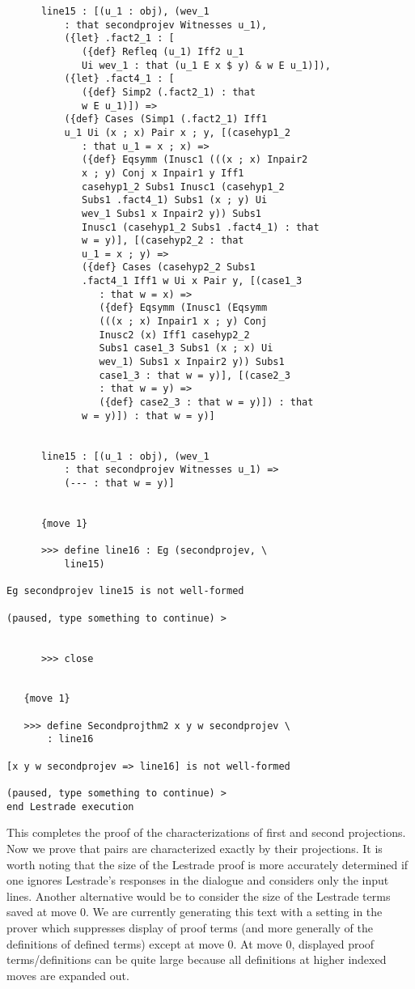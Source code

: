 \documentclass[12pt]{article}
\begin{document}
\begin{verbatim}
      line15 : [(u_1 : obj), (wev_1 
          : that secondprojev Witnesses u_1), 
          ({let} .fact2_1 : [
             ({def} Refleq (u_1) Iff2 u_1 
             Ui wev_1 : that (u_1 E x $ y) & w E u_1)]), 
          ({let} .fact4_1 : [
             ({def} Simp2 (.fact2_1) : that 
             w E u_1)]) => 
          ({def} Cases (Simp1 (.fact2_1) Iff1 
          u_1 Ui (x ; x) Pair x ; y, [(casehyp1_2 
             : that u_1 = x ; x) => 
             ({def} Eqsymm (Inusc1 (((x ; x) Inpair2 
             x ; y) Conj x Inpair1 y Iff1 
             casehyp1_2 Subs1 Inusc1 (casehyp1_2 
             Subs1 .fact4_1) Subs1 (x ; y) Ui 
             wev_1 Subs1 x Inpair2 y)) Subs1 
             Inusc1 (casehyp1_2 Subs1 .fact4_1) : that 
             w = y)], [(casehyp2_2 : that 
             u_1 = x ; y) => 
             ({def} Cases (casehyp2_2 Subs1 
             .fact4_1 Iff1 w Ui x Pair y, [(case1_3 
                : that w = x) => 
                ({def} Eqsymm (Inusc1 (Eqsymm 
                (((x ; x) Inpair1 x ; y) Conj 
                Inusc2 (x) Iff1 casehyp2_2 
                Subs1 case1_3 Subs1 (x ; x) Ui 
                wev_1) Subs1 x Inpair2 y)) Subs1 
                case1_3 : that w = y)], [(case2_3 
                : that w = y) => 
                ({def} case2_3 : that w = y)]) : that 
             w = y)]) : that w = y)]


      line15 : [(u_1 : obj), (wev_1 
          : that secondprojev Witnesses u_1) => 
          (--- : that w = y)]


      {move 1}

      >>> define line16 : Eg (secondprojev, \
          line15)

Eg secondprojev line15 is not well-formed

(paused, type something to continue) >


      >>> close


   {move 1}

   >>> define Secondprojthm2 x y w secondprojev \
       : line16

[x y w secondprojev => line16] is not well-formed

(paused, type something to continue) >
end Lestrade execution
\end{verbatim}

This completes the proof of the characterizations of first and second projections.  Now we prove that pairs are characterized exactly by their projections.  It is worth noting that
the size of the Lestrade proof is more accurately determined if one ignores Lestrade's responses in the dialogue and considers only the input lines.  Another alternative would be to consider the size of the Lestrade terms saved at move 0.  We are currently generating this text with a setting in the prover which suppresses display of proof terms
(and more generally of the definitions of defined terms) except at move 0.  At move 0, displayed proof terms/definitions can be quite large because all definitions at higher indexed moves are expanded out.
\end{document}
